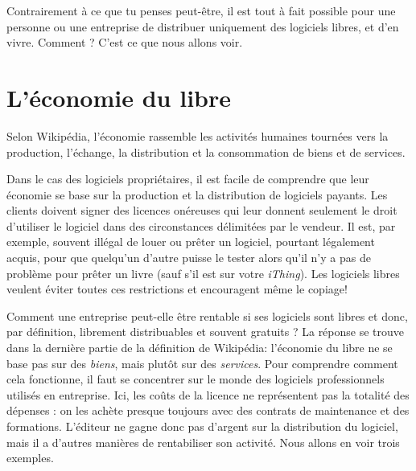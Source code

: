 \documentclass[10pt]{../fiche}
\begin{document}

\vspace{15pt}
Contrairement à ce que tu penses peut-être, il est tout à fait possible pour une personne ou une entreprise de distribuer uniquement des logiciels libres, et d'en vivre. Comment ? C'est ce que nous allons voir.
\section*{L'économie du libre}
Selon Wikipédia, l'économie rassemble les activités humaines tournées vers la production, l'échange, la distribution et la consommation de biens et de services.

Dans le cas des logiciels propriétaires, il est facile de comprendre que leur économie se base sur la production et la distribution de logiciels payants. %
Les clients doivent signer des licences onéreuses qui
leur donnent seulement le droit d'utiliser le logiciel dans des circonstances délimitées par le vendeur.
Il est, par exemple, souvent illégal de louer ou prêter un logiciel, pourtant légalement acquis,
pour que quelqu'un d'autre puisse le tester alors qu'il n'y a pas de problème pour prêter un livre (sauf s'il est sur votre \textit{iThing}). Les logiciels libres veulent éviter toutes ces restrictions et encouragent même le copiage!

Comment une entreprise peut-elle être rentable si ses logiciels sont libres et donc, par définition, librement distribuables et souvent gratuits ? La réponse se trouve dans la dernière partie de la définition de Wikipédia: l'économie du libre ne se base pas sur des \textit{biens}, mais plutôt sur des \textit{services}. Pour comprendre comment cela fonctionne, il faut se concentrer sur le monde
des logiciels professionnels utilisés en entreprise. Ici, les coûts de la licence
ne représentent pas la totalité des dépenses : on les achète presque toujours avec
des contrats de maintenance et des formations.
L'éditeur ne gagne donc pas d'argent sur la distribution du logiciel, mais il a d'autres manières de rentabiliser son activité. Nous allons en voir trois exemples.
\end{document}
